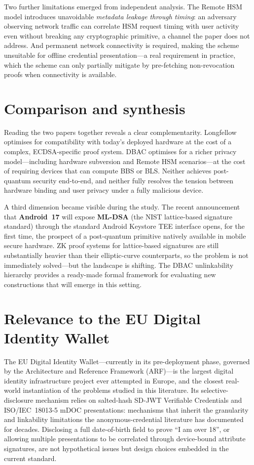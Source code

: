 \documentclass[11pt]{article}
\begin{document}
Two further limitations emerged from independent analysis. The Remote HSM
model introduces unavoidable \emph{metadata leakage through timing}: an
adversary observing network traffic can correlate HSM request timing with
user activity even without breaking any cryptographic primitive, a channel
the paper does not address. And permanent network connectivity is required,
making the scheme unsuitable for offline credential presentation---a real
requirement in practice, which the scheme can only partially mitigate by
pre-fetching non-revocation proofs when connectivity is available.

\section{Comparison and synthesis}

Reading the two papers together reveals a clear complementarity. Longfellow
optimises for compatibility with today's deployed hardware at the cost of a
complex, ECDSA-specific proof system. DBAC optimises for a richer privacy
model---including hardware subversion and Remote HSM scenarios---at the cost
of requiring devices that can compute BBS or BLS. Neither achieves
post-quantum security end-to-end, and neither fully resolves the tension
between hardware binding and user privacy under a fully malicious device.

A third dimension became visible during the study. The recent announcement
that \textbf{Android~17} will expose \textbf{ML-DSA} (the NIST lattice-based
signature standard) through the standard Android Keystore TEE interface opens,
for the first time, the prospect of a post-quantum primitive natively
available in mobile secure hardware. ZK proof systems for lattice-based
signatures are still substantially heavier than their elliptic-curve
counterparts, so the problem is not immediately solved---but the landscape is
shifting. The DBAC unlinkability hierarchy provides a ready-made formal
framework for evaluating new constructions that will emerge in this setting.

\section{Relevance to the EU Digital Identity Wallet}

The EU Digital Identity Wallet---currently in its pre-deployment phase,
governed by the Architecture and Reference Framework (ARF)---is the largest
digital identity infrastructure project ever attempted in Europe, and the
closest real-world instantiation of the problems studied in this literature.
Its selective-disclosure mechanism relies on salted-hash SD-JWT Verifiable
Credentials and ISO/IEC~18013-5 mDOC presentations: mechanisms that inherit
the granularity and linkability limitations the anonymous-credential
literature has documented for decades. Disclosing a full date-of-birth field
to prove ``I am over 18'', or allowing multiple presentations to be
correlated through device-bound attribute signatures, are not hypothetical
issues but design choices embedded in the current standard.
\end{document}
